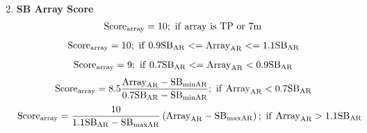 \documentclass[a4paper,10pt,english]{sphinxmanual}
\begin{document}
\begin{enumerate}
\begin{gather}
\end{gather}
\item {} 
\textbf{SB Array Score}
\label{algorithm:equation-tp}\begin{gather}
\begin{split}\rm{Score}_{\rm{array}} = 10 ; \rm{\ if\ array\ is\ TP\ or\ 7m}\end{split}\label{algorithm-tp}
\end{gather}\label{algorithm:equation-match}\begin{gather}
\begin{split}\rm{Score}_{\rm{array}} = 10 ; \rm{\ if\ } 0.9 \rm{SB}_{\rm{AR}}
        <= \rm{Array}_{\rm{AR}} <= 1.1 \rm{SB}_{\rm{AR}}\end{split}\label{algorithm-match}
\end{gather}\label{algorithm:equation-low}\begin{gather}
\begin{split}\rm{Score}_{\rm{array}} = 9 ; \rm{\ if\ } 0.7 \rm{SB}_{\rm{AR}}
       <= \rm{Array}_{\rm{AR}} < 0.9 \rm{SB}_{\rm{AR}}\end{split}\label{algorithm-low}
\end{gather}\label{algorithm:equation-toolow}\begin{gather}
\begin{split}\rm{Score}_{\rm{array}} = 8.5\frac{\rm{Array}_{\rm{AR}} - \rm{SB}_{\rm{minAR}}}{0.7\rm{SB}_{\rm{AR}} - \rm{SB}_{\rm{minAR}}}
       ; \rm{\ if\ } \rm{Array}_{\rm{AR}} < 0.7 \rm{SB}_{\rm{AR}}\end{split}\label{algorithm-toolow}
\end{gather}\label{algorithm:equation-high}\begin{gather}
\begin{split}\rm{Score}_{\rm{array}} = \frac{10}{1.1\rm{SB}_{\rm{AR}} - \rm{SB}_{\rm{maxAR}}} \left(\rm{Array}_{\rm{AR}} - \rm{SB}_{\rm{maxAR}}\right)
       ; \rm{\ if\ } \rm{Array}_{\rm{AR}} > 1.1 \rm{SB}_{\rm{AR}}\end{split}\label{algorithm-high}
\end{gather}\begin{figure}[htbp]
\centering
\capstart


\end{figure}
\end{enumerate}
\end{document}
